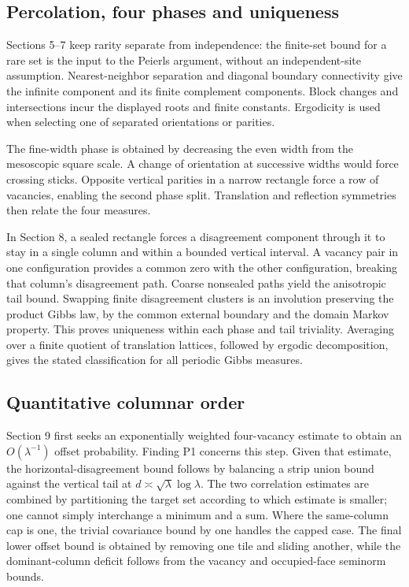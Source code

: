 \documentclass[10pt]{article}
\begin{document}
\subsection*{Percolation, four phases and uniqueness}
Sections 5–7 keep rarity separate from independence: the finite-set bound for a rare set is the input to the Peierls argument, without an independent-site assumption. Nearest-neighbor separation and diagonal boundary connectivity give the infinite component and its finite complement components. Block changes and intersections incur the displayed roots and finite constants. Ergodicity is used when selecting one of separated orientations or parities.\par
The fine-width phase is obtained by decreasing the even width from the mesoscopic square scale. A change of orientation at successive widths would force crossing sticks. Opposite vertical parities in a narrow rectangle force a row of vacancies, enabling the second phase split. Translation and reflection symmetries then relate the four measures.\par
In Section 8, a sealed rectangle forces a disagreement component through it to stay in a single column and within a bounded vertical interval. A vacancy pair in one configuration provides a common zero with the other configuration, breaking that column’s disagreement path. Coarse nonsealed paths yield the anisotropic tail bound. Swapping finite disagreement clusters is an involution preserving the product Gibbs law, by the common external boundary and the domain Markov property. This proves uniqueness within each phase and tail triviality. Averaging over a finite quotient of translation lattices, followed by ergodic decomposition, gives the stated classification for all periodic Gibbs measures.\par
\subsection*{Quantitative columnar order}
Section 9 first seeks an exponentially weighted four-vacancy estimate to obtain an \(O(\lambda^{-1})\) offset probability. Finding P1 concerns this step. Given that estimate, the horizontal-disagreement bound follows by balancing a strip union bound against the vertical tail at \(d\asymp\sqrt\lambda\log\lambda\). The two correlation estimates are combined by partitioning the target set according to which estimate is smaller; one cannot simply interchange a minimum and a sum. Where the same-column cap is one, the trivial covariance bound by one handles the capped case. The final lower offset bound is obtained by removing one tile and sliding another, while the dominant-column deficit follows from the vacancy and occupied-face seminorm bounds.\par
\end{document}
